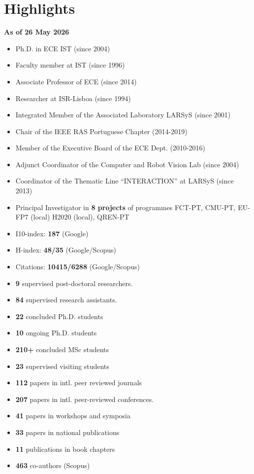\section*{Highlights}\label{highlights}

\textbf{As of 26 May 2026}

\begin{itemize}
\item
  Ph.D. in ECE IST (since 2004)
\item
  Faculty member at IST (since 1996)
\item
  Associate Professor of ECE (since 2014)
\item
  Researcher at ISR-Lisboa (since 1994)
\item
  Integrated Member of the Associated Laboratory LARSyS (since 2001)
\item
  Chair of the IEEE RAS Portuguese Chapter (2014-2019)
\item
  Member of the Executive Board of the ECE Dept. (2010-2016)
\item
  Adjunct Coordinator of the Computer and Robot Vision Lab (since 2004)
\item
  Coordinator of the Thematic Line ``INTERACTION'' at LARSyS (since
  2013)
\item
  Principal Investigator in \textbf{8 projects} of programmes FCT-PT,
  CMU-PT, EU-FP7 (local) H2020 (local), QREN-PT
\item
  I10-index: \textbf{187} (Google)
\item
  H-index: \textbf{48/35} (Google/Scopus)
\item
  Citations: \textbf{10415/6288} (Google/Scopus)
\item
  \textbf{9} supervised post-doctoral researchers.
\item
  \textbf{84} supervised research assistants.
\item
  \textbf{22} concluded Ph.D. students
\item
  \textbf{10} ongoing Ph.D. students
\item
  \textbf{210+} concluded MSc students
\item
  \textbf{23} supervised visiting students
\item
  \textbf{112} papers in intl. peer reviewed journals
\item
  \textbf{207} papers in intl. peer-reviewed conferences.
\item
  \textbf{41} papers in workshops and symposia
\item
  \textbf{33} papers in national publications
\item
  \textbf{11} publications in book chapters
\item
  \textbf{463} co-authors (Scopus)
\end{itemize}
